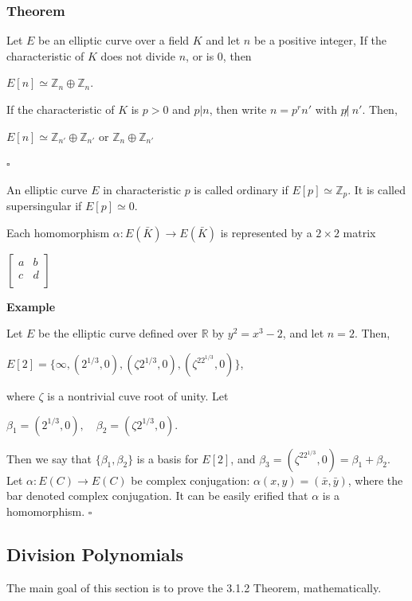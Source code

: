\documentclass[a4paper, 12pt]{article}
\begin{document}
\subsubsection{Theorem}
Let $E$ be an elliptic curve over a field $K$ and let $n$ be a positive integer, If the characteristic of $K$ does not divide $n$, or is 0, then
\begin{center} $E[n] \simeq \mathbb{Z}_n \oplus \mathbb{Z}_n.$ \end{center}
If the characteristic of $K$ is $p > 0$ and $p | n$, then write $n = p^rn'$ with $p\not | \:n'$. Then,
\begin{center} 
$E[n] \simeq \mathbb{Z}_{n'} \oplus \mathbb{Z}_{n'}$ \quad or \quad $\mathbb{Z}_n \oplus \mathbb{Z}_{n'}$
\end{center}
$\square$\par
An elliptic curve $E$ in characteristic $p$ is called ordinary if $E[p] \simeq \mathbb{Z}_{p}$. It is called supersingular if $E[p] \simeq 0.$\par
Each homomorphism $\alpha: E(\bar{K}) \rightarrow E(\bar{K})$ is represented by a $2 \times 2$ matrix
\begin{center} 
	$\begin{bmatrix} 
	a & b \\
	c & d\\
	\end{bmatrix}$
\end{center}
\textbf{Example} \par
Let $E$ be the elliptic curve defined over $\mathbb{R}$ by $y^2=x^3-2$, and let $n=2$. Then, 
\begin{center} $E[2] = \{\infty, (2^{1/3}, 0), (\zeta2^{1/3}, 0), (\zeta^22^{1/3}, 0)\}$, \end{center}
where $\zeta$ is a nontrivial cuve root of unity. Let
\begin{center} $\beta_1 = (2^{1/3}, 0), \quad \beta_2=(\zeta2^{1/3}, 0).$ \end{center}
Then we say that $\{\beta_1,\beta_2\}$ is a basis for $E[2]$, and $\beta_3 = (\zeta^22^{1/3}, 0) = \beta_1+\beta_2$.\newline
Let $\alpha: E(C) \longrightarrow E(C)$ be complex conjugation: $\alpha(x,y) = (\bar{x},\bar{y})$, where the bar denoted complex conjugation. It can be easily erified that $\alpha$ is a homomorphism. $\square$
\subsection {Division Polynomials}
The main goal of this section is to prove the 3.1.2 Theorem, mathematically.
\end{document}
